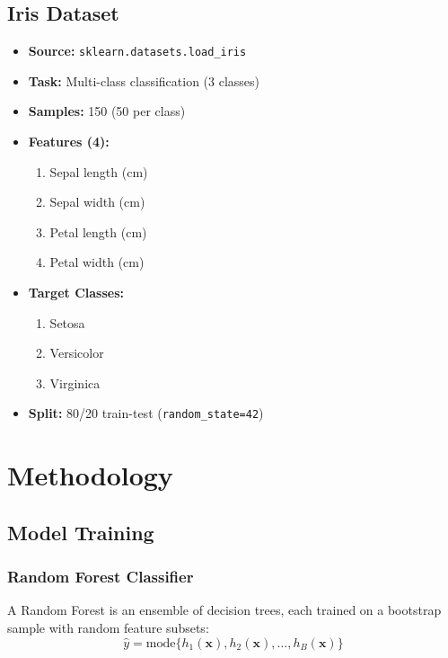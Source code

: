 \documentclass[12pt,a4paper]{article}
\begin{document}
\subsection{Iris Dataset}
\begin{itemize}
    \item \textbf{Source:} \texttt{sklearn.datasets.load\_iris}
    \item \textbf{Task:} Multi-class classification (3 classes)
    \item \textbf{Samples:} 150 (50 per class)
    \item \textbf{Features (4):}
    \begin{enumerate}
        \item Sepal length (cm)
        \item Sepal width (cm)
        \item Petal length (cm)
        \item Petal width (cm)
    \end{enumerate}
    \item \textbf{Target Classes:}
    \begin{enumerate}[start=0]
        \item Setosa
        \item Versicolor
        \item Virginica
    \end{enumerate}
    \item \textbf{Split:} 80/20 train-test (\texttt{random\_state=42})
\end{itemize}

\section{Methodology}

\subsection{Model Training}

\subsubsection{Random Forest Classifier}
A Random Forest is an ensemble of decision trees, each trained on a bootstrap sample with random feature subsets:
\begin{equation}
    \hat{y} = \text{mode}\{h_1(\mathbf{x}), h_2(\mathbf{x}), \ldots, h_B(\mathbf{x})\}
\end{equation}
\end{document}
